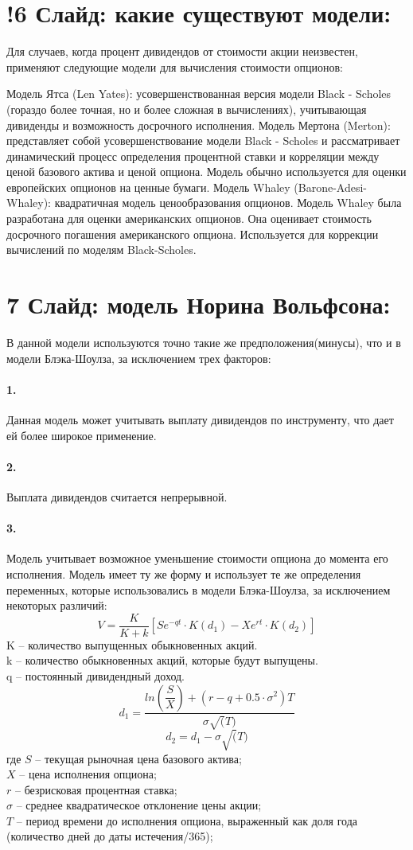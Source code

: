 \documentclass[a4paper]{article}
\begin{document}
\section*{!6 Слайд: какие существуют модели:}
Для случаев, когда процент дивидендов от стоимости акции неизвестен, применяют следующие модели для вычисления стоимости опционов:

Модель Ятса (Len Yates): усовершенствованная версия модели Black - Scholes (гораздо более точная, но и более сложная в вычислениях), учитывающая дивиденды и возможность досрочного исполнения.
Модель Мертона (Merton): представляет собой усовершенствование модели Black - Scholes и рассматривает динамический процесс определения процентной ставки и корреляции между ценой базового актива и ценой опциона. Модель обычно используется для оценки европейских опционов на ценные бумаги.
Модель Whaley (Barone-Adesi-Whaley): квадратичная модель ценообразования опционов. Модель Whaley была разработана для оценки американских опционов. Она оценивает стоимость досрочного погашения американского опциона. Используется для коррекции вычислений по моделям Black-Scholes.

\section*{7 Слайд: модель Норина Вольфсона:}
В данной модели используются точно такие же предположения(минусы), что и в модели Блэка-Шоулза, за исключением трех факторов:
\paragraph*{1.} Данная модель может учитывать выплату дивидендов по инструменту, что дает ей более широкое применение.
\paragraph*{2.} Выплата дивидендов считается непрерывной.
\paragraph*{3.} Модель учитывает возможное уменьшение стоимости опциона до момента его исполнения.
Модель имеет ту же форму и использует те же определения переменных, которые использовались в модели Блэка-Шоулза, за исключением некоторых различий:
\[V = \dfrac{K}{K+k} \left[ Se^{-qt} \cdot K(d_1) - Xe^{rt} \cdot K(d_2)\right]\]
K -- количество выпущенных обыкновенных акций. \\
k -- количество обыкновенных акций, которые будут выпущены.\\
q -- постоянный дивидендный доход.
\[d_1 = \dfrac{ ln \left( \dfrac{S}{X} \right) + (r - q + 0.5 \cdot \sigma^2) T}{\sigma \sqrt(T)}\]
\[d_2 = d_1 - \sigma \sqrt(T)\]
где $S$ -- текущая рыночная цена базового актива; \\
$X$ – цена исполнения опциона; \\ 
$r$ -- безрисковая процентная ставка; \\
$\sigma$ -- среднее квадратическое отклонение цены акции; \\
$T$ -- период времени до исполнения опциона, выраженный как доля года (количество дней до даты истечения/365);
\end{document}
